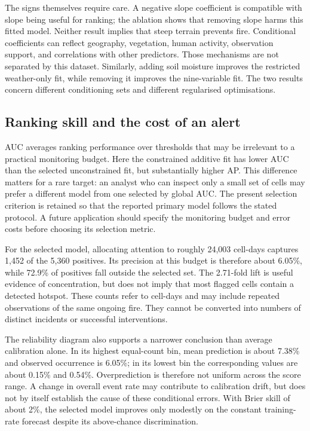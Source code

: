 \documentclass[conference]{IEEEtran}
\begin{document}
The signs themselves require care. A negative slope coefficient is compatible with slope being useful for ranking; the ablation shows that removing slope harms this fitted model. Neither result implies that steep terrain prevents fire. Conditional coefficients can reflect geography, vegetation, human activity, observation support, and correlations with other predictors. Those mechanisms are not separated by this dataset. Similarly, adding soil moisture improves the restricted weather-only fit, while removing it improves the nine-variable fit. The two results concern different conditioning sets and different regularised optimisations.

\subsection{Ranking skill and the cost of an alert}
AUC averages ranking performance over thresholds that may be irrelevant to a practical monitoring budget. Here the constrained additive fit has lower AUC than the selected unconstrained fit, but substantially higher AP. This difference matters for a rare target: an analyst who can inspect only a small set of cells may prefer a different model from one selected by global AUC. The present selection criterion is retained so that the reported primary model follows the stated protocol. A future application should specify the monitoring budget and error costs before choosing its selection metric.

For the selected model, allocating attention to roughly 24,003 cell-days captures 1,452 of the 5,360 positives. Its precision at this budget is therefore about 6.05\%, while 72.9\% of positives fall outside the selected set. The 2.71-fold lift is useful evidence of concentration, but does not imply that most flagged cells contain a detected hotspot. These counts refer to cell-days and may include repeated observations of the same ongoing fire. They cannot be converted into numbers of distinct incidents or successful interventions.

The reliability diagram also supports a narrower conclusion than average calibration alone. In its highest equal-count bin, mean prediction is about 7.38\% and observed occurrence is 6.05\%; in its lowest bin the corresponding values are about 0.15\% and 0.54\%. Overprediction is therefore not uniform across the score range. A change in overall event rate may contribute to calibration drift, but does not by itself establish the cause of these conditional errors. With Brier skill of about 2\%, the selected model improves only modestly on the constant training-rate forecast despite its above-chance discrimination.
\end{document}
